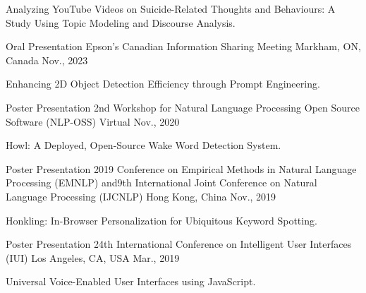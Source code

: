 \begin{cventries}
{\begin{cvitems}
\item {Analyzing YouTube Videos on Suicide-Related Thoughts and Behaviours: A Study Using Topic Modeling and Discourse Analysis.}
\end{cvitems}
}
\cventry
{Oral Presentation} %
{Epson's Canadian Information Sharing Meeting} %
{Markham, ON, Canada} %
{Nov., 2023} %
{ %
\begin{cvitems}
\item {Enhancing 2D Object Detection Efficiency through Prompt Engineering.}
\end{cvitems}
}
\cventry
{Poster Presentation} %
{2nd Workshop for Natural Language Processing Open Source Software (NLP-OSS)} %
{Virtual} %
{Nov., 2020} %
{ %
\begin{cvitems}
\item {Howl: A Deployed, Open-Source Wake Word Detection System.}
\end{cvitems}
}
\cventry
{Poster Presentation} %
{2019 Conference on Empirical Methods in Natural Language Processing (EMNLP) and\newline 9th International Joint Conference on Natural Language Processing (IJCNLP)} %
{Hong Kong, China} %
{Nov., 2019} %
{ %
\begin{cvitems}
\item {Honkling: In-Browser Personalization for Ubiquitous Keyword Spotting.}
\end{cvitems}
}
\cventry
{Poster Presentation} %
{24th International Conference on Intelligent User Interfaces (IUI)} %
{Los Angeles, CA, USA} %
{Mar., 2019} %
{ %
\begin{cvitems}
\item {Universal Voice-Enabled User Interfaces using JavaScript.}
\end{cvitems}
}
\end{cventries}

